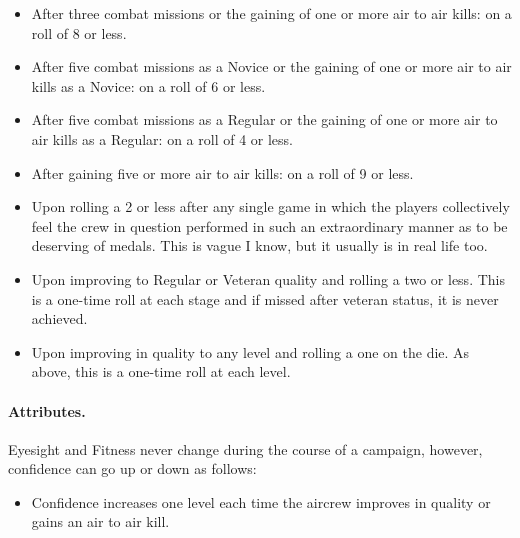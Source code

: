 \begin{advancedrules}
{\begin{itemize}

    \item {} After three combat missions or the gaining of one or more air to air kills: on a roll of 8 or less.

    \item {} After five combat missions as a Novice or the gaining of one or more air to air kills as a Novice: on a roll of 6 or less.

    \item {} After five combat missions as a Regular or the gaining of one or more air to air kills as a Regular: on a roll of 4 or less.

    \item {} After gaining five or more air to air kills: on a roll of 9 or less.

    \item {} Upon rolling a 2 or less after any single game in which the players collectively feel the crew in question performed in such an extraordinary manner as to be deserving of medals. This is vague I know, but it usually is in real life too.

    \item {} Upon improving to Regular or Veteran quality and rolling a two or less. This is a one-time roll at each stage and if missed after veteran status, it is never achieved.

    \item {} Upon improving in quality to any level and rolling a one on the die. As above, this is a one-time roll at each level.
    
\end{itemize}

\paragraph{Attributes.} Eyesight and Fitness never change during the course of a campaign, however, confidence can go up or down as follows:
\begin{itemize}

    \item Confidence increases one level each time the aircrew improves in quality or gains an air to air kill.


\end{itemize}}
\end{advancedrules}
